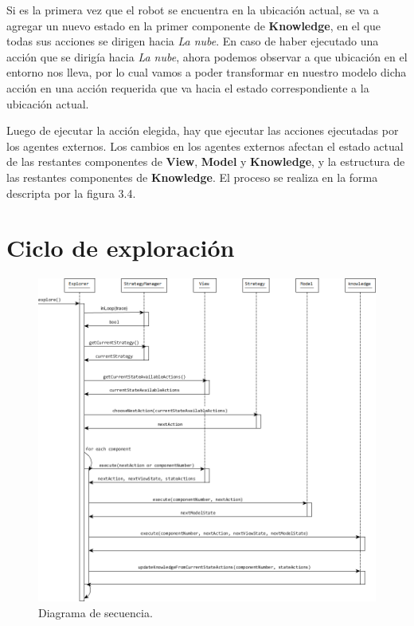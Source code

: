 \vspace{\baselineskip}
Si es la primera vez que el robot se encuentra en la ubicación actual, se va a agregar un nuevo estado en la primer componente de \textbf{Knowledge}, en el que todas
sus acciones se dirigen hacia \textit{La nube}. En caso de haber ejecutado una acción que se dirigía hacia \textit{La nube}, ahora podemos observar a que ubicación
en el entorno nos lleva, por lo cual vamos a poder transformar en nuestro modelo dicha acción en una acción requerida que va hacia el estado correspondiente
a la ubicación actual.

\vspace{\baselineskip}
Luego de ejecutar la acción elegida, hay que ejecutar las acciones ejecutadas por los agentes externos. Los cambios en los agentes externos afectan el estado actual
de las restantes componentes de \textbf{View}, \textbf{Model} y \textbf{Knowledge}, y la estructura de las restantes componentes de \textbf{Knowledge}. El proceso se
realiza en la forma descripta por la figura 3.4.

\section{Ciclo de exploración}

\begin{figure}[H]
  \centering
    \includegraphics[width=1.0\textwidth]{Imagenes/Algoritmo/Secuencia_explorar.png}
  \caption{Diagrama de secuencia.}
  \label{fig:Secuencia_explorar}
\end{figure}

